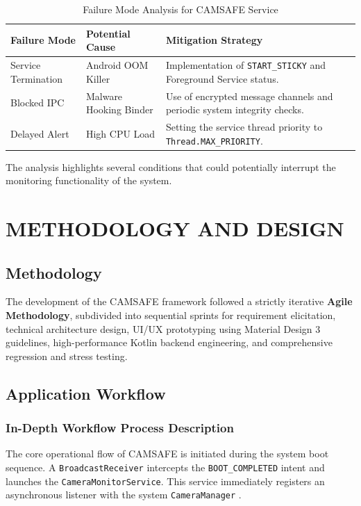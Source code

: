 \documentclass[12pt,a4paper]{report}
\begin{document}
\begin{enumerate}
\begin{table}[H]
    \centering
    \caption{Failure Mode Analysis for CAMSAFE Service}
    \begin{tabular}{|p{3cm}|p{4cm}|p{6cm}|}
        \hline
        \textbf{Failure Mode} & \textbf{Potential Cause} & \textbf{Mitigation Strategy} \\
        \hline
        Service Termination & Android OOM Killer & Implementation of \texttt{START\_STICKY} and Foreground Service status. \\
        \hline
        Blocked IPC & Malware Hooking Binder & Use of encrypted message channels and periodic system integrity checks. \\
        \hline
        Delayed Alert & High CPU Load & Setting the service thread priority to \texttt{Thread.MAX\_PRIORITY}. \\
        \hline
    \end{tabular}
\end{table}

The analysis highlights several conditions that could potentially interrupt the
monitoring functionality of the system. 
    \chapter{METHODOLOGY AND DESIGN}
    \section{Methodology}
    The development of the CAMSAFE framework followed a strictly iterative \textbf{Agile Methodology}, subdivided into sequential sprints for requirement elicitation, technical architecture design, UI/UX prototyping using Material Design 3 guidelines, high-performance Kotlin backend engineering, and comprehensive regression and stress testing.

    \section{Application Workflow}
    \subsection{In-Depth Workflow Process Description}
    The core operational flow of CAMSAFE is initiated during the system boot sequence. A \texttt{BroadcastReceiver} intercepts the \texttt{BOOT\_COMPLETED} intent and launches the \texttt{CameraMonitorService}. This service immediately registers an asynchronous listener with the system \texttt{CameraManager} \cite{androidhal}.


\end{enumerate}
\end{document}
